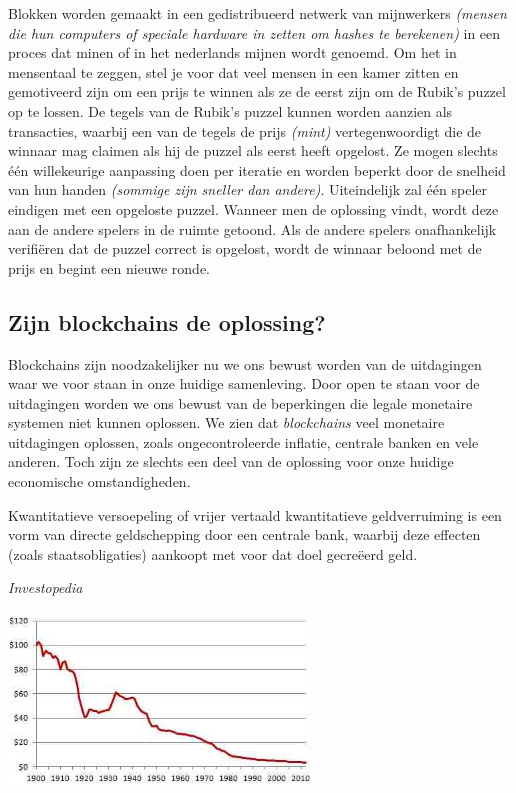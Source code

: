 \documentclass[11pt]{article}
\begin{document}
Blokken worden gemaakt in een gedistribueerd netwerk van mijnwerkers \textit{(mensen die hun computers of speciale hardware in zetten om hashes te berekenen)} in een proces dat minen of in het nederlands mijnen wordt genoemd.
Om het in mensentaal te zeggen, stel je voor dat veel mensen in een kamer zitten en gemotiveerd zijn om een ​​prijs te winnen als ze de eerst zijn om de Rubik's puzzel op te lossen. De tegels van de Rubik's puzzel kunnen worden aanzien als transacties, waarbij een van de tegels de prijs \textit{(mint)} vertegenwoordigt die de winnaar mag claimen als hij de puzzel als eerst heeft opgelost. 
Ze mogen slechts \'e\'en willekeurige aanpassing doen per iteratie en worden beperkt door de snelheid van hun handen \textit{(sommige zijn sneller dan andere)}.
Uiteindelijk zal \'e\'en speler eindigen met een opgeloste puzzel. Wanneer men de oplossing vindt, wordt deze aan de andere spelers in de ruimte getoond. Als de andere spelers onafhankelijk verifi\"eren dat de puzzel correct is opgelost, wordt de winnaar beloond met de prijs en begint een nieuwe ronde.

\subsection{Zijn blockchains de oplossing?}

Blockchains zijn noodzakelijker nu we ons bewust worden van de uitdagingen waar we voor staan ​​in onze huidige samenleving. Door open te staan voor de uitdagingen worden we ons bewust van de beperkingen die legale monetaire systemen niet kunnen oplossen. We zien dat \textit{blockchains} veel monetaire uitdagingen oplossen, zoals ongecontroleerde inflatie, centrale banken en vele anderen. Toch zijn ze slechts een deel van de oplossing voor onze huidige economische omstandigheden.

\epigraph{Kwantitatieve versoepeling of vrijer vertaald kwantitatieve geldverruiming is een vorm van directe geldschepping door een centrale bank, waarbij deze effecten (zoals staatsobligaties) aankoopt met voor dat doel gecre\"eerd geld.}{\textit{Investopedia}}

\vspace{-138pt}
\hspace{-25pt}
\includegraphics[width=0.60\textwidth]{./images/us-dollar.jpg}
\vspace{5pt}
\end{document}
